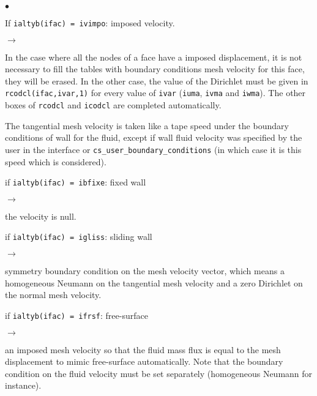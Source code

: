 {{\begin{list}{$\bullet$}{}

\item If \texttt{ialtyb(ifac) = ivimpo}: imposed velocity.

\begin{list}{$\rightarrow$}{}
\item In the case where all the nodes of a face have a imposed displacement,
 it is not necessary to fill the tables with boundary conditions
 mesh velocity for this face, they will be erased. In the other case,
 the value of the Dirichlet must be given in \texttt{rcodcl(ifac,ivar,1)} for
 every value of \texttt{ivar} (\texttt{iuma}, \texttt{ivma} and \texttt{iwma}).
 The other boxes of \texttt{rcodcl} and \texttt{icodcl} are completed automatically.

 The tangential mesh velocity is taken like a tape speed under the
 boundary conditions of wall for the fluid, except if wall fluid velocity
 was specified by the user in the interface or \texttt{cs\_user\_boundary\_conditions} (in which case
 it is this speed which is considered).
\end{list}

 \item if \texttt{ialtyb(ifac) = ibfixe}: fixed wall
\begin{list}{$\rightarrow$}{}
 \item the velocity is null.
\end{list}

 \item if \texttt{ialtyb(ifac) = igliss}: sliding wall
\begin{list}{$\rightarrow$}{}
\item symmetry boundary condition on the mesh velocity vector, which means a homogeneous Neumann on the tangential mesh velocity and a zero Dirichlet on the normal mesh velocity.
\end{list}

 \item if \texttt{ialtyb(ifac) = ifrsf}: free-surface
\begin{list}{$\rightarrow$}{}
\item an imposed mesh velocity so that the fluid mass flux is equal to the mesh displacement to mimic free-surface automatically. Note that the boundary condition on the fluid velocity must be set separately (homogeneous Neumann for instance).
\end{list}

\end{list}
}

}
